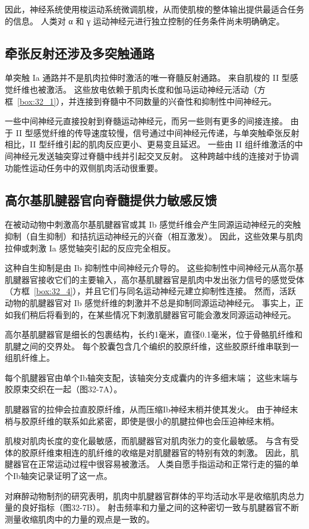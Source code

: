 因此，神经系统使用梭运动系统微调肌梭，从而使肌梭的整体输出提供最适合任务的信息。
人类对 α 和 γ 运动神经元进行独立控制的任务条件尚未明确确定。



\subsection{牵张反射还涉及多突触通路}

单突触 Ia 通路并不是肌肉拉伸时激活的唯一脊髓反射通路。
来自肌梭的 II 型感觉纤维也被激活。
这些放电依赖于肌肉长度和伽马运动神经元活动（方框~\ref{box:32_1}），并连接到脊髓中不同数量的兴奋性和抑制性中间神经元。


一些中间神经元直接投射到脊髓运动神经元，而另一些则有更多的间接连接。
由于 II 型感觉纤维的传导速度较慢，信号通过中间神经元传递，与单突触牵张反射相比，II 型纤维引起的肌肉反应更小、更易变且延迟。
一些由 II 组纤维激活的中间神经元发送轴突穿过脊髓中线并引起交叉反射。
这种跨越中线的连接对于协调功能性运动任务中的双侧肌肉活动很重要。



\subsection{高尔基肌腱器官向脊髓提供力敏感反馈}

在被动动物中刺激高尔基肌腱器官或其 Ib 感觉纤维会产生同源运动神经元的突触抑制（自生抑制）和拮抗运动神经元的兴奋（相互激发）。
因此，这些效果与肌肉拉伸或刺激 Ia 感觉轴突引起的反应完全相反。


这种自生抑制是由 Ib 抑制性中间神经元介导的。
这些抑制性中间神经元从高尔基肌腱器官接收它们的主要输入，高尔基肌腱器官是肌肉中发出张力信号的感觉受体（方框~\ref{box:32_4}），并且它们与同名运动神经元建立抑制性连接。
然而，活跃动物的肌腱器官对 Ib 感觉纤维的刺激并不总是抑制同源运动神经元。
事实上，正如我们稍后将看到的，在某些情况下刺激肌腱器官可能会激发同源运动神经元。


\begin{proposition}[神经解剖学导航术语] \label{box:32_4}
	
	\quad \quad 高尔基肌腱器官是细长的包裹结构，长约1毫米，直径0.1毫米，位于骨骼肌纤维和肌腱之间的交界处。
	每个胶囊包含几个编织的胶原纤维，这些胶原纤维串联到一组肌纤维上。
	
	\quad \quad 每个肌腱器官由单个Ib轴突支配，该轴突分支成囊内的许多细末端；
	这些末端与胶原束交织在一起（图32-7A）。
	
	\quad \quad 肌腱器官的拉伸会拉直胶原纤维，从而压缩Ib神经末梢并使其发火。
	由于神经末梢与胶原纤维的联系如此紧密，即使是很小的肌腱拉伸也会压迫神经末梢。
	
	\quad \quad 肌梭对肌肉长度的变化最敏感，而肌腱器官对肌肉张力的变化最敏感。
	与含有受体的胶原纤维束相连的肌纤维的收缩是对肌腱器官的特别有效的刺激。
	因此，肌腱器官在正常运动过程中很容易被激活。
	人类自愿手指运动和正常行走的猫的单个Ib轴突记录证明了这一点。
	
	\quad \quad 对麻醉动物制剂的研究表明，肌肉中肌腱器官群体的平均活动水平是收缩肌肉总力量的良好指标（图32-7B）。
	射击频率和力量之间的这种密切一致与肌腱器官不断测量收缩肌肉中的力量的观点是一致的。
	
\end{proposition}



